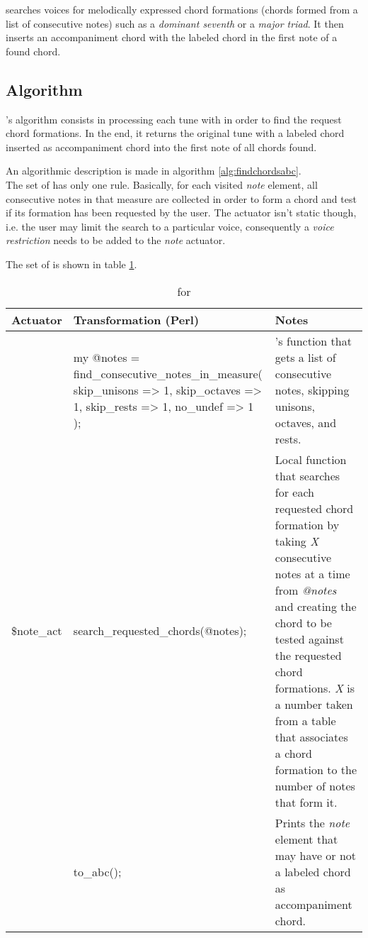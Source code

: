 \findchordsabc{} searches voices for melodically expressed chord formations (chords formed from a
list of consecutive notes) such as a \emph{dominant seventh} or a \emph{major triad}. It then
inserts an accompaniment chord with the labeled chord in the first note of a found chord.

\subsection*{Algorithm}

\findchordsabc{}'s algorithm consists in processing each tune with \dt{} in order to find the
request chord formations. In the end, it returns the original tune with a labeled chord inserted as
accompaniment chord into the first note of all chords found.

An algorithmic description is made in algorithm \ref{alg:findchordsabc}.\\

The set of \abcdtrules{} has only one rule. Basically, for each visited \emph{note} element, all
consecutive notes in that measure are collected in order to form a chord and test if its formation
has been requested by the user. The actuator isn't static though, i.e. the user may limit the search
to a particular voice, consequently a \emph{voice restriction} needs to be added to the \emph{note}
actuator.

The set of \abcdtrules{} is shown in table \ref{tab:find_chords_abc_stage}.

\begin{center}
  \begin{table}[h]
    \begin{tabular}{|p{2cm}|p{7cm}|p{6cm}|}
      \hline
      Actuator & Transformation (Perl) & Notes\\
      \hline
      \hline
      \multirow{15}{*}{\$note\_act}
      & my @notes = find\_consecutive\_notes\_in\_measure( { skip\_unisons => 1, skip\_octaves => 1,
      skip\_rests   => 1, no\_undef     => 1 } );& \abcdt{}'s function that gets a list of
      consecutive notes, skipping unisons, octaves, and rests.
      \\

      & search\_requested\_chords(@notes); & Local function that searches for each requested chord
      formation by taking \emph{X} consecutive notes at a time from \emph{@notes} and creating the
      chord to be tested against the requested chord formations. \emph{X} is a number taken from a
      table that associates a chord formation to the number of notes that form it.
      \\

      & to\_abc(); & Prints the \emph{note} element that may have or not a labeled chord as
      accompaniment chord.
      \\
      \hline
    \end{tabular}
    \caption{\abcdtrules{} for \findchordsabc{}}
    \label{tab:find_chords_abc_stage}
  \end{table}
\end{center}

